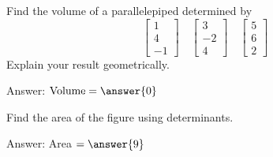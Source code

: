 \documentclass{ximera}
\begin{document}
\begin{problem}\label{prob:volparallelepiped0}
Find the volume of a parallelepiped determined by 
$$\begin{bmatrix}1\\4\\-1\end{bmatrix}\quad\begin{bmatrix}3\\-2\\4\end{bmatrix}\quad\begin{bmatrix}5\\6\\2\end{bmatrix}$$
Explain your result geometrically.

Answer: $\mbox{Volume}=\answer{0}$
\end{problem}

\begin{problem}\label{prob:multiTriangleArea}  Find the area of the figure using determinants.
    \begin{center}
\end{center} 

Answer: Area $=\answer{9}$
\end{problem}
\end{document}

